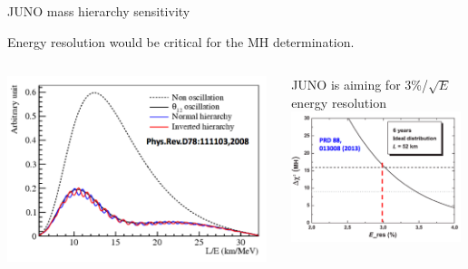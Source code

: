 \begin{frame}{JUNO mass hierarchy sensitivity}

Energy resolution would be critical for the MH determination.
\begin{columns}[T]
  \begin{column}{0.55\textwidth}
    \centering
     \includegraphics[width=0.98\textwidth]{./images/3nu/reactor/juno_wiggles.png}\\
  \end{column}
  \begin{column}{0.45\textwidth}
     {\color{red}JUNO is aiming for 3\%/$\sqrt{E}$ energy resolution}\\
     \vspace{0.4cm}
     \includegraphics[width=0.98\textwidth]{./images/3nu/reactor/juno_MHsign_vs_Eresolution.png}\\
  \end{column}
\end{columns}
\end{frame}


